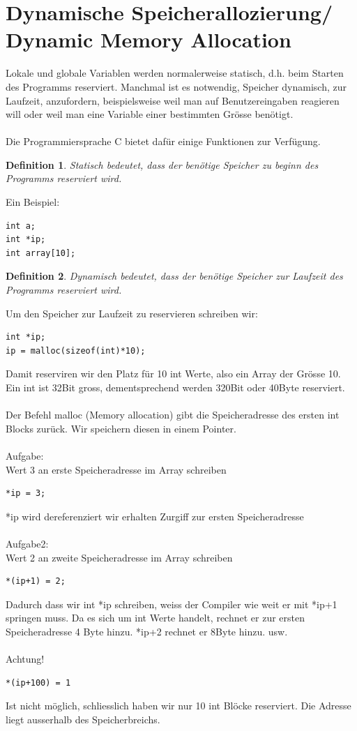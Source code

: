 \documentclass[a4paper,10pt]{report}
\newtheorem{mydef}{Definition}
\begin{document}
\section{Dynamische Speicherallozierung/ Dynamic Memory Allocation}
Lokale und globale Variablen werden normalerweise statisch, d.h. beim Starten des Programms reserviert. Manchmal ist es notwendig, Speicher dynamisch, zur Laufzeit, anzufordern, beispielsweise weil man auf Benutzereingaben reagieren will oder weil man eine Variable einer bestimmten Grösse benötigt. \\ \\
Die Programmiersprache C bietet dafür einige Funktionen zur Verfügung.
\begin{mydef}
	Statisch bedeutet, dass der benötige Speicher zu beginn des Programms reserviert wird.
\end{mydef}
Ein Beispiel:
\begin{lstlisting}[frame=single] 
int a;
int *ip;
int array[10];
\end{lstlisting}
\begin{mydef}
	Dynamisch bedeutet, dass der benötige Speicher zur Laufzeit des Programms reserviert wird.
\end{mydef}
Um den Speicher zur Laufzeit zu reservieren schreiben wir:
\begin{lstlisting}[frame=single] 
int *ip;
ip = malloc(sizeof(int)*10);
\end{lstlisting}
Damit reserviren wir den Platz für 10 int Werte, also ein Array der Grösse 10.
Ein int ist 32Bit gross, dementsprechend werden 320Bit oder 40Byte reserviert.\\
\\
Der Befehl malloc (Memory allocation) gibt die Speicheradresse des ersten int Blocks zurück. Wir speichern diesen in einem Pointer.\\
\\
Aufgabe:\\
Wert 3 an erste Speicheradresse im Array schreiben
\begin{lstlisting}[frame=single] 
*ip = 3;
\end{lstlisting}
*ip wird dereferenziert wir erhalten Zurgiff zur ersten Speicheradresse\\
\\
Aufgabe2:\\
Wert 2 an zweite Speicheradresse im Array schreiben
\begin{lstlisting}[frame=single] 
*(ip+1) = 2;
\end{lstlisting}
Dadurch dass wir int *ip schreiben, weiss der Compiler wie weit er mit *ip+1 springen muss. Da es sich um int Werte handelt, rechnet er zur ersten Speicheradresse 4 Byte hinzu. *ip+2 rechnet er 8Byte hinzu. usw.\\
\\
Achtung!
\begin{lstlisting}[frame=single] 
*(ip+100) = 1
\end{lstlisting}
Ist nicht möglich, schliesslich haben wir nur 10 int Blöcke reserviert. Die Adresse liegt ausserhalb des Speicherbreichs.
\end{document}
